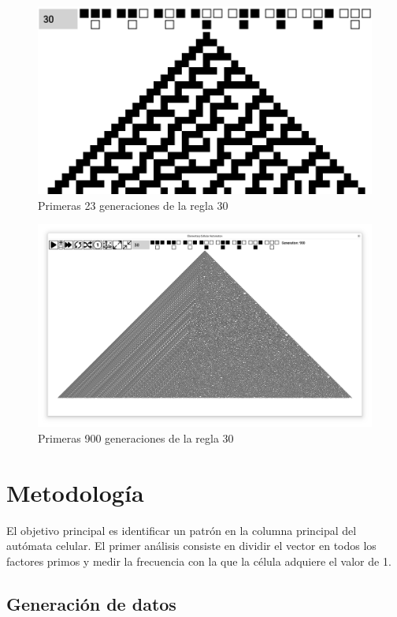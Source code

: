 \documentclass[12pt,twoside]{article}
\begin{document}
	\begin{figure}[H]
		\centering
		\includegraphics[width=\textwidth]{img/r30_1.png}
		\caption{Primeras 23 generaciones de la regla 30}
		\label{img:r30_1}
	\end{figure}
	
	\begin{figure}[H]
		\centering
		\includegraphics[width=\textwidth]{img/r30_2.png}
		\caption{Primeras 900 generaciones de la regla 30}
		\label{img:r30_2}
	\end{figure}
	
	\section{Metodología}
	
	El objetivo principal es identificar un patrón en la columna principal del autómata celular. El primer análisis consiste en dividir el vector en todos los factores primos y medir la frecuencia con la que la célula adquiere el valor de 1.
	
	\subsection{Generación de datos}
	
\end{document}
